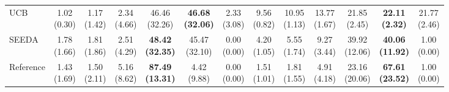 {\begin{tabular}{l|cccccc|cccccc}
UCB & \makecell{1.02 \\ (0.30)} & \makecell{1.17 \\ (1.42)} & \makecell{2.34 \\ (4.66)} & {\cellcolor[HTML]{C8E6C9}} \makecell{46.46 \\ (32.26)} & \bfseries \makecell{46.68 \\ (32.06)} & \makecell{2.33 \\ (3.08)} & \makecell{9.56 \\ (0.82)} & \makecell{10.95 \\ (1.13)} & \makecell{13.77 \\ (1.67)} & {\cellcolor[HTML]{C8E6C9}} \makecell{21.85 \\ (2.45)} & \bfseries \makecell{22.11 \\ (2.32)} & \makecell{21.77 \\ (2.46)} \\
SEEDA & \makecell{1.78 \\ (1.66)} & \makecell{1.81 \\ (1.86)} & \makecell{2.51 \\ (4.29)} & {\cellcolor[HTML]{C8E6C9}} \bfseries \makecell{48.42 \\ (32.35)} & \makecell{45.47 \\ (32.10)} & \makecell{0.00 \\ (0.00)} & \makecell{4.20 \\ (1.05)} & \makecell{5.55 \\ (1.74)} & \makecell{9.27 \\ (3.44)} & {\cellcolor[HTML]{C8E6C9}} \makecell{39.92 \\ (12.06)} & \bfseries \makecell{40.06 \\ (11.92)} & \makecell{1.00 \\ (0.00)} \\
Reference & \makecell{1.43 \\ (1.69)} & \makecell{1.50 \\ (2.11)} & \makecell{5.16 \\ (8.62)} & {\cellcolor[HTML]{C8E6C9}} \bfseries \makecell{87.49 \\ (13.31)} & \makecell{4.42 \\ (9.88)} & \makecell{0.00 \\ (0.00)} & \makecell{1.51 \\ (1.01)} & \makecell{1.81 \\ (1.55)} & \makecell{4.91 \\ (4.18)} & {\cellcolor[HTML]{C8E6C9}} \makecell{23.16 \\ (20.06)} & \bfseries \makecell{67.61 \\ (23.52)} & \makecell{1.00 \\ (0.00)} \\

\end{tabular}}
